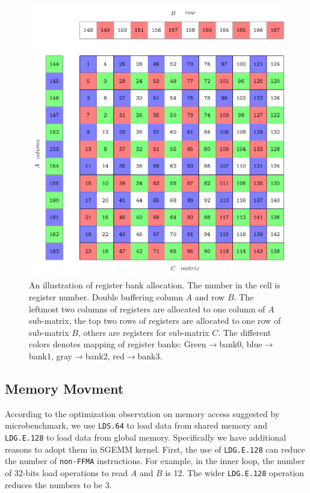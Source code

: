 \documentclass{sig-alternate-05-2015}
\begin{document}
\begin{figure}[htbp]
\begin{center}
\includegraphics[scale=0.55]{reg}
\caption{An illustration of register bank allocation. The number in the cell is register number. Double buffering column
    $A$ and row $B$. The leftmost two columns of registers are allocated to one column of $A$ sub-matrix, the
top two rows of registers are allocated to one row of sub-matrix $B$, others are registers for
sub-matrix $C$. The different colors denotes mapping of register banks: Green$\rightarrow$bank0, blue$\rightarrow$bank1, gray$\rightarrow$bank2, red$\rightarrow$bank3.}
\label{fig:reg}
\end{center}
\end{figure}


\subsection{Memory Movment}
According to the optimization observation on memory access suggested by microbenchmark, we use {\tt LDS.64} to load data from shared memory and {\tt LDG.E.128} to load data from global memory. Specifically we have additional reasons to adopt them in SGEMM kernel. First, the use of {\tt LDG.E.128} can reduce the number of {\tt non-FFMA} instructions. For example,  in the inner loop, the number of 32-bits load operations to read $A$ and $B$ is 12. The wider {\tt LDG.E.128} operation reduces the numbers to be 3.
\end{document}
